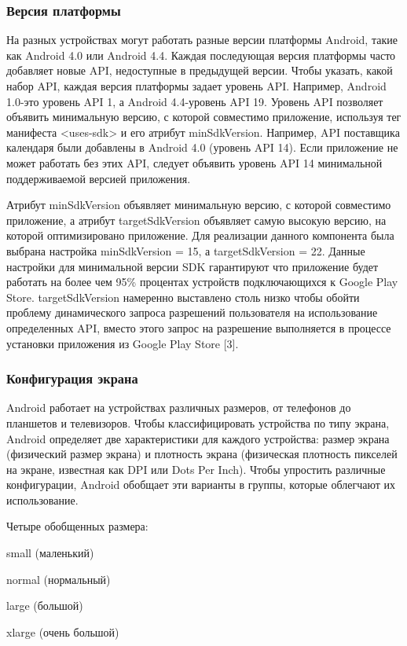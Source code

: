 \subsubsection{Версия платформы}
На разных устройствах могут работать разные версии платформы Android, такие как Android 4.0 или Android 4.4. Каждая последующая версия платформы часто добавляет новые API, недоступные в предыдущей версии. Чтобы указать, какой набор API, каждая версия платформы задает уровень API. Например, Android 1.0-это уровень API 1, а Android 4.4-уровень API 19.
Уровень API позволяет объявить минимальную версию, с которой совместимо приложение, используя тег манифеста <uses-sdk> и его атрибут minSdkVersion. Например, API поставщика календаря были добавлены в Android 4.0 (уровень API 14). Если приложение не может работать без этих API, следует объявить уровень API 14 минимальной поддерживаемой версией приложения.

Атрибут minSdkVersion объявляет минимальную версию, с которой совместимо приложение, а атрибут targetSdkVersion объявляет самую высокую версию, на которой оптимизировано приложение.
Для реализации данного компонента была выбрана настройка minSdkVersion = 15, а targetSdkVersion = 22. Данные настройки для минимальной версии SDK гарантируют что приложение будет работать на более чем 95\% процентах устройств подключающихся к Google Play Store. targetSdkVersion намеренно выставлено столь низко чтобы обойти проблему динамического запроса разрешений пользователя на использование определенных API, вместо этого запрос на разрешение выполняется в процессе установки приложения из Google Play Store [3].

\subsubsection{Конфигурация экрана}
Android работает на устройствах различных размеров, от телефонов до планшетов и телевизоров. Чтобы классифицировать устройства по типу экрана, Android определяет две характеристики для каждого устройства: размер экрана (физический размер экрана) и плотность экрана (физическая плотность пикселей на экране, известная как DPI или Dots Per Inch). Чтобы упростить различные конфигурации, Android обобщает эти варианты в группы, которые облегчают их использование.

Четыре обобщенных размера: 
\begin{my_enumerate}
\item small (маленький)
\item normal (нормальный)
\item large (большой)
\item xlarge (очень большой)
\end{my_enumerate}

